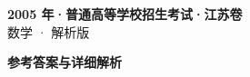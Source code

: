 \documentclass[zihao=-4, a4paper]{ctexart}
\begin{document}
\begin{center}
  {\Large\bfseries 2005 年·普通高等学校招生考试·江苏卷}\\[4pt]
  {\large 数学 · 解析版}
\end{center}
\medskip
{}

\clearpage
{}
\begin{center}{\Large\bfseries 参考答案与详细解析}\end{center}
\medskip

\end{document}
